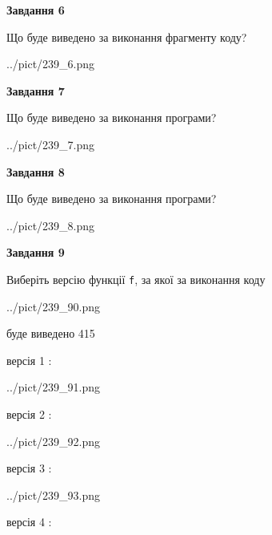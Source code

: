 \documentclass[12pt, ukrainian]{article}
\def\code#1{\Verb!#1!}
\begin{document}
{\begin {large}
{\begin {center}\textbf{Завдання 6}\end {center}}

Що буде виведено за виконання фрагменту коду?\par
\begin{center}
	{../pict/239_6.png}
\end{center}
\newpage

{\begin {center}\textbf{Завдання 7}\end {center}}

Що буде виведено за виконання програми?\par
\begin{center}
	{../pict/239_7.png}
\end{center}
\newpage

{\begin {center}\textbf{Завдання 8}\end {center}}

Що буде виведено за виконання програми?\par
\begin{center}
	{../pict/239_8.png}
\end{center}
\newpage

{\begin {center}\textbf{Завдання 9}\end {center}}

Виберіть версію функції \code{f}, за якої за виконання коду
\begin{center}
	{../pict/239_90.png}
\end{center}
буде виведено 415

\vspace{5mm}
версія 1 :

\begin{center}
	{../pict/239_91.png}
\end{center}
версія 2 :

\begin{center}
	{../pict/239_92.png}
\end{center}
версія 3 :

\begin{center}
	{../pict/239_93.png}
\end{center}
версія 4 :


\end{large}}
\end{document}
